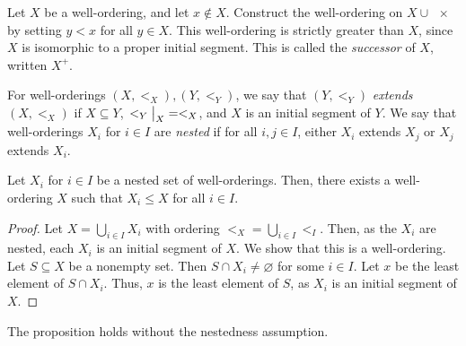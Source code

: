 Let \( X \) be a well-ordering, and let \( x \not\in X \).
Construct the well-ordering on \( X \cup \qty{x} \) by setting \( y < x \) for all \( y \in X \).
This well-ordering is strictly greater than \( X \), since \( X \) is isomorphic to a proper initial segment.
This is called the \emph{successor} of \( X \), written \( X^+ \).

For well-orderings \( (X, <_X), (Y, <_Y) \), we say that \( (Y, <_Y) \) \emph{extends} \( (X, <_X) \) if \( X \subseteq Y \), \( \eval{<_Y}_{X} = <_X \), and \( X \) is an initial segment of \( Y \).
We say that well-orderings \( X_i \) for \( i \in I \) are \emph{nested} if for all \( i, j \in I \), either \( X_i \) extends \( X_j \) or \( X_j \) extends \( X_i \).
\begin{proposition}
    Let \( X_i \) for \( i \in I \) be a nested set of well-orderings.
    Then, there exists a well-ordering \( X \) such that \( X_i \leq X \) for all \( i \in I \).
\end{proposition}
\begin{proof}
    Let \( X = \bigcup_{i \in I} X_i \) with ordering \( <_X = \bigcup_{i \in I} <_I \).
    Then, as the \( X_i \) are nested, each \( X_i \) is an initial segment of \( X \).
    We show that this is a well-ordering.
    Let \( S \subseteq X \) be a nonempty set.
    Then \( S \cap X_i \neq \varnothing \) for some \( i \in I \).
    Let \( x \) be the least element of \( S \cap X_i \).
    Thus, \( x \) is the least element of \( S \), as \( X_i \) is an initial segment of \( X \).
\end{proof}
\begin{remark}
    The proposition holds without the nestedness assumption.
\end{remark}

